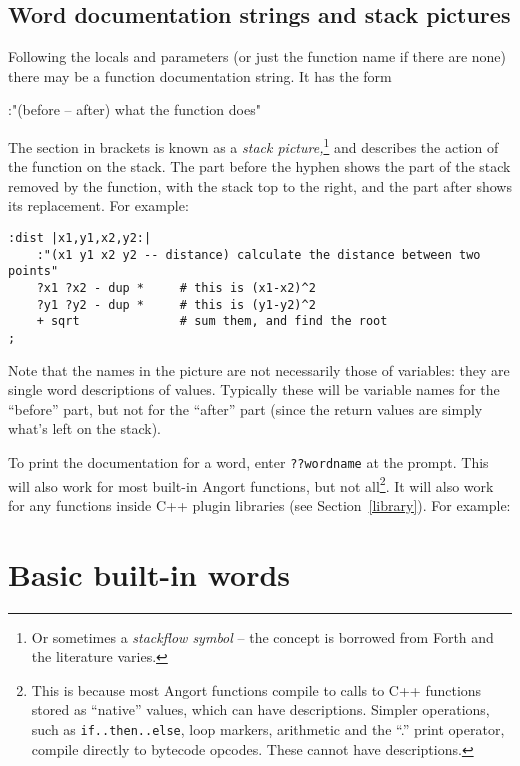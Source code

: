 \subsection{Word documentation strings and stack pictures}
\label{stackpic}
Following the locals and parameters (or just the function name if there
are none) there may be a function documentation string. It has the form
\begin{v}
:"(before -- after) what the function does"
\end{v}
The section in brackets is known as a \emph{stack picture,}\footnote{Or sometimes
a \emph{stackflow symbol} -- the concept is borrowed from Forth and the literature
varies.} and describes
the action of the function on the stack. The part before the hyphen
shows the part of the stack removed by the function, with
the stack top to the right, and the part after
shows its replacement. For example:
\begin{lstlisting}
:dist |x1,y1,x2,y2:|
    :"(x1 y1 x2 y2 -- distance) calculate the distance between two points"
    ?x1 ?x2 - dup *     # this is (x1-x2)^2
    ?y1 ?y2 - dup *     # this is (y1-y2)^2
    + sqrt              # sum them, and find the root
;
\end{lstlisting}
Note that the names in the picture are not necessarily those of variables:
they are single word descriptions of values. Typically these will be variable
names for the ``before'' part, but not for the ``after'' part (since
the return values are simply what's left on the stack).

To print the documentation for a word, enter \texttt{??wordname} at
the prompt. This will also work for most built-in Angort functions,
but not all\footnote{This is because most Angort functions compile
to calls to C++ functions stored as ``native'' values,
which can have descriptions. Simpler operations,
such as \texttt{if..then..else}, loop markers, arithmetic and the ``.'' print operator, compile directly to bytecode opcodes.
These cannot have descriptions.}. It will also work for any functions
inside C++ plugin libraries (see Section~\ref{library}). For example:


\section{Basic built-in words}
